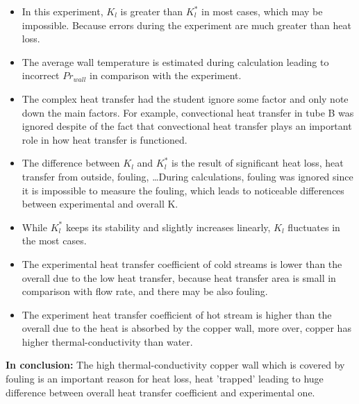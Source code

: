 \begin{itemize}
    \item In this experiment, $K_l$ is greater than $K_l^*$ in most cases, which may be impossible. Because errors during the experiment are much greater than heat loss.
    \item The average wall temperature is estimated during calculation leading to incorrect $Pr_{wall}$ in comparison with the experiment.
    \item The complex heat transfer had the student ignore some factor and only note down the main factors. For example, convectional heat transfer in tube B was ignored despite of the fact that convectional heat transfer plays an important role in how heat transfer is functioned.
    \item The difference between $K_l$ and $K_l^*$ is the result of significant heat loss, heat transfer from outside, fouling, \dots During calculations, fouling was ignored since it is impossible to measure the fouling, which leads to noticeable differences between experimental and overall K.
    \item While $K_l^*$ keeps its stability and slightly increases linearly, $K_l$ fluctuates in the most cases.
    \item The experimental heat transfer coefficient of cold streams is lower than the overall due to the low heat transfer, because heat transfer area is small in comparison with flow rate, and there may be also fouling.
    \item The experiment heat transfer coefficient of hot stream is higher than the overall due to the heat is absorbed by the copper wall, more over, copper has higher thermal-conductivity than water.
\end{itemize}

\textbf{In conclusion:} The high thermal-conductivity copper wall which is covered by fouling is an important reason for heat loss, heat 'trapped' leading to huge difference between overall heat transfer coefficient and experimental one.
